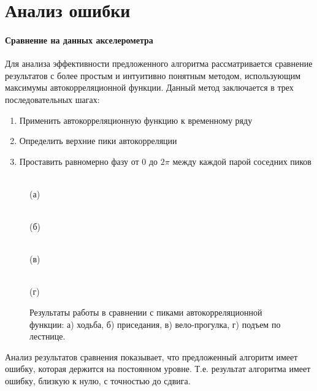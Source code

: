 \documentclass[12pt, twoside]{article}
\theoremstyle{definition}
\begin{document}
\section{Анализ ошибки}
\paragraph{Сравнение на данных акселерометра}
Для анализа эффективности предложенного алгоритма рассматривается сравнение результатов с более простым и интуитивно понятным методом, использующим максимумы автокорреляционной функции. Данный метод заключается в трех последовательных шагах:
    \begin{enumerate}
        \item Применить автокорреляционную функцию к временному ряду
        \item Определить верхние пики автокорреляции
        \item Проставить равномерно фазу от $0$ до $2\pi$ между каждой парой соседних пиков
    \end{enumerate}

\begin{figure}[H]
\begin{minipage}[ht]{0.47\linewidth}
\\ (а)
\end{minipage}
\hfill
\begin{minipage}[ht]{0.47\linewidth}
\\(б)
\end{minipage}
\vfill
\begin{minipage}[ht]{0.47\linewidth}
\\(в)
\end{minipage}
\hfill
\begin{minipage}[ht]{0.47\linewidth}
\\(г)
\end{minipage}
\caption{Результаты работы в сравнении с пиками автокорреляционной функции: а) ходьба, б) приседания, в) вело-прогулка, г) подъем по лестнице.}
\label{fg:results_comp}
\end{figure}

Анализ результатов сравнения показывает, что предложенный алгоритм имеет ошибку, которая держится на постоянном уровне. Т.е. результат алгоритма имеет ошибку, близкую к нулю, с точностью до сдвига.
\end{document}
